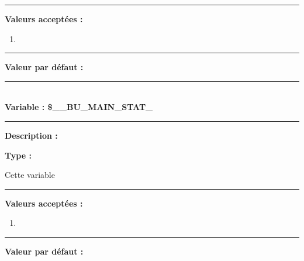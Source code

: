\documentclass[a4paper,10pt]{article}
\begin{document}

\par\noindent\rule{\textwidth}{0.4pt}

\textbf{Valeurs acceptées :}
\begin{enumerate}
    \item
\end{enumerate}

\par\noindent\rule{\textwidth}{0.4pt}

\textbf{Valeur par défaut :}




\color{vars}\par\noindent\rule{\textwidth}{0.4pt}\color{text}\\[1\baselineskip]

\textbf{Variable : \color{vars}\$\_\_BU\_MAIN\_STAT\_}\\[1\baselineskip]

\par\noindent\rule{\textwidth}{0.4pt}

\begin{justify}
    \textbf{Description :}
\end{justify}

\setlength{\parskip}{1em}

\begin{justify}
    \textbf{Type : }
\end{justify}

\setlength{\parskip}{1em}

\begin{justify}
    Cette variable
\end{justify}

\par\noindent\rule{\textwidth}{0.4pt}

\textbf{Valeurs acceptées :}
\begin{enumerate}
    \item
\end{enumerate}

\par\noindent\rule{\textwidth}{0.4pt}

\textbf{Valeur par défaut :}



\end{document}
